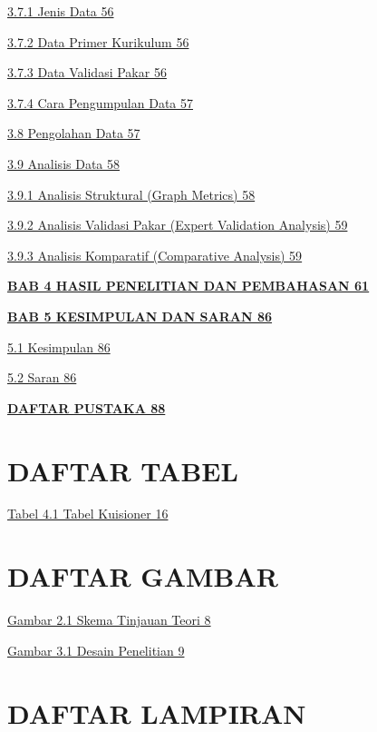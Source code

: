 \documentclass[
]{article}
\begin{document}
\protect\hyperlink{jenis-data}{3.7.1 Jenis Data 56}

\protect\hyperlink{data-primer-kurikulum}{3.7.2 Data Primer Kurikulum
56}

\protect\hyperlink{data-validasi-pakar}{3.7.3 Data Validasi Pakar 56}

\protect\hyperlink{cara-pengumpulan-data}{3.7.4 Cara Pengumpulan Data
57}

\protect\hyperlink{pengolahan-data}{3.8 Pengolahan Data 57}

\protect\hyperlink{analisis-data}{3.9 Analisis Data 58}

\protect\hyperlink{analisis-struktural-graph-metrics}{3.9.1 Analisis
Struktural (Graph Metrics) 58}

\protect\hyperlink{analisis-validasi-pakar-expert-validation-analysis}{3.9.2
Analisis Validasi Pakar (Expert Validation Analysis) 59}

\protect\hyperlink{analisis-komparatif-comparative-analysis}{3.9.3
Analisis Komparatif (Comparative Analysis) 59}

\protect\hyperlink{hasil-penelitian-dan-pembahasan}{\textbf{BAB 4 HASIL
PENELITIAN DAN PEMBAHASAN 61}}

\protect\hyperlink{kesimpulan-dan-saran}{\textbf{BAB 5 KESIMPULAN DAN
SARAN 86}}

\protect\hyperlink{kesimpulan}{5.1 Kesimpulan 86}

\protect\hyperlink{saran}{5.2 Saran 86}

\protect\hyperlink{daftar-pustaka}{\textbf{DAFTAR PUSTAKA 88}}

\hypertarget{daftar-tabel}{%
\section{\texorpdfstring{\hfill\break
DAFTAR TABEL}{ DAFTAR TABEL}}\label{daftar-tabel}}

\protect\hyperlink{_jls36balo6xc}{Tabel 4.1 Tabel Kuisioner 16}

\hypertarget{daftar-gambar}{%
\section{DAFTAR GAMBAR}\label{daftar-gambar}}

\protect\hyperlink{_dk75faergxj3}{Gambar 2.1 Skema Tinjauan Teori 8}

\protect\hyperlink{_xb27bq47u611}{Gambar 3.1 Desain Penelitian 9}

\hypertarget{daftar-lampiran}{%
\section{DAFTAR LAMPIRAN}\label{daftar-lampiran}}
\end{document}
